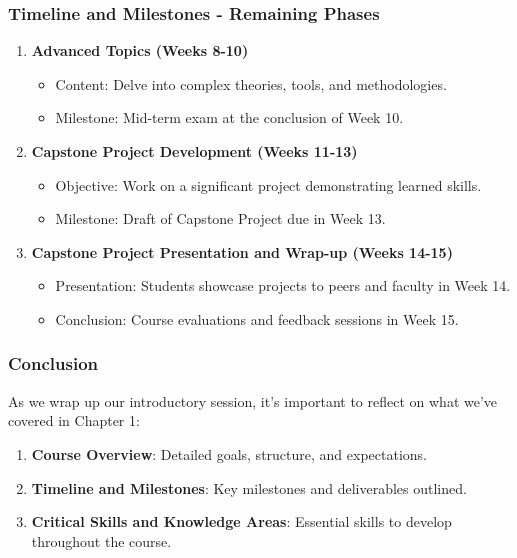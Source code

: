 \documentclass[aspectratio=169]{beamer}
\begin{document}
\begin{frame}[fragile]
    \frametitle{Timeline and Milestones - Remaining Phases}
    \begin{enumerate}[resume]
        \item \textbf{Advanced Topics (Weeks 8-10)}
            \begin{itemize}
                \item Content: Delve into complex theories, tools, and methodologies.
                \item Milestone: Mid-term exam at the conclusion of Week 10.
            \end{itemize}

        \item \textbf{Capstone Project Development (Weeks 11-13)}
            \begin{itemize}
                \item Objective: Work on a significant project demonstrating learned skills.
                \item Milestone: Draft of Capstone Project due in Week 13.
            \end{itemize}

        \item \textbf{Capstone Project Presentation and Wrap-up (Weeks 14-15)}
            \begin{itemize}
                \item Presentation: Students showcase projects to peers and faculty in Week 14.
                \item Conclusion: Course evaluations and feedback sessions in Week 15.
            \end{itemize}
    \end{enumerate}
\end{frame}

\begin{frame}[fragile]
    \frametitle{Conclusion}
    As we wrap up our introductory session, it's important to reflect on what we’ve covered in Chapter 1:
    
    \begin{enumerate}
        \item \textbf{Course Overview}: Detailed goals, structure, and expectations.
        \item \textbf{Timeline and Milestones}: Key milestones and deliverables outlined.
        \item \textbf{Critical Skills and Knowledge Areas}: Essential skills to develop throughout the course.
    \end{enumerate}
\end{frame}
\end{document}
